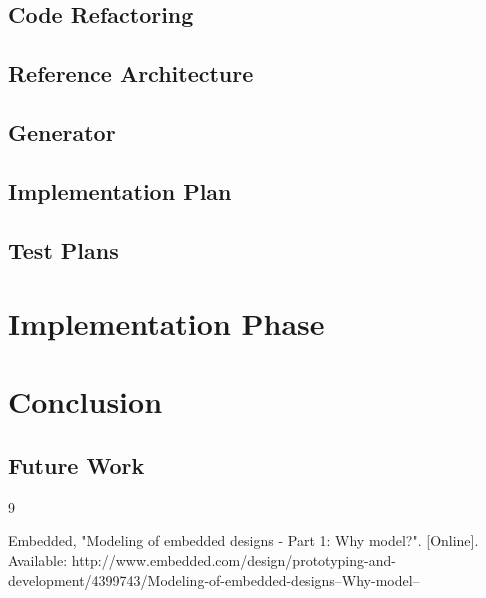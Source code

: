 \documentclass{report}
\begin{document}
    \subsection{Code Refactoring}
	
    \subsection{Reference Architecture}
    
    \subsection{Generator}
    
    \subsection{Implementation Plan}
    
    \subsection{Test Plans}
    
    \section{Implementation Phase}
    
    \section{Conclusion}
    
    \subsection{Future Work}
    
	
	\newpage
		
	\begin{thebibliography} {9}
			
		
		 Embedded, "Modeling of embedded designs - Part 1: Why model?". [Online]. Available: http://www.embedded.com/design/prototyping-and-development/4399743/Modeling-of-embedded-designs--Why-model--
				
	\end{thebibliography}
	
\end{document}
